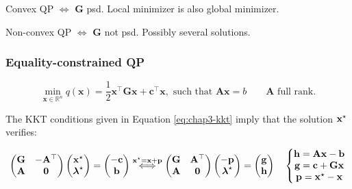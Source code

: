 Convex QP $\Leftrightarrow$ $\mathbf{G}$ psd. Local minimizer is also
global minimizer.

Non-convex QP $\Leftrightarrow$ $\mathbf{G}$ not psd. Possibly several
solutions.

\subsubsection{Equality-constrained QP}

\begin{equation}
\label{eq:chap3-qp-eq}
\min_{\mathbf{x} \in \mathbb R^n}
q(\mathbf{x})=\frac{1}{2}\mathbf{x}^{\top}\mathbf{G}\mathbf{x}
+\mathbf{c}^{\top}\mathbf{x},\text{ such that }
\mathbf{A}\mathbf{x} = b
\qquad \mathbf{A} \text{ full rank.}
\end{equation}

The KKT conditions given in Equation \ref{eq:chap3-kkt} imply that the
solution $\mathbf{x}^{\star}$ verifies:

\begin{equation}
  \label{eq:chap3-qp-kkt}
  \left(\begin{matrix}
    \mathbf{G} & -\mathbf{A}^{\top} \\
    \mathbf{A} & \mathbf{0}
  \end{matrix}\right)
  \left(\begin{matrix}
    \mathbf{x}^{\star} \\
    \boldsymbol{\lambda}^{\star}
  \end{matrix}\right)
  = \left(\begin{matrix}
    -\mathbf{c} \\
    \mathbf{b}
  \end{matrix}\right)  
  \overset{\mathbf{x}^{\star}=\mathbf{x}+\mathbf{p}}\Longleftrightarrow
  \left(\begin{matrix}
    \mathbf{G} & \mathbf{A}^{\top} \\
    \mathbf{A} & \mathbf{0} \\
  \end{matrix}\right)
  \left(\begin{matrix}
    -\mathbf{p} \\
    \boldsymbol{\lambda}^{\star}
  \end{matrix}\right)
  = \left(\begin{matrix}
    \mathbf{g} \\
    \mathbf{h}
  \end{matrix}\right)
  \quad
  \left\{\begin{matrix}
      \mathbf{h} = \mathbf{A}\mathbf{x} - \mathbf{b} \\
      \mathbf{g} = \mathbf{c} + \mathbf{G}\mathbf{x} \\
      \mathbf{p} = \mathbf{x}^{\star} - \mathbf{x}
    \end{matrix}\right.
\end{equation}

